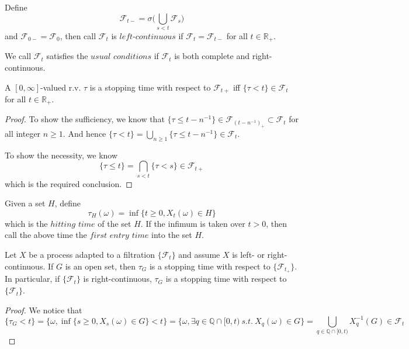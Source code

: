 \documentclass[lang=en, color=blue, ]{elegantbook}
\newcommand{\F}{\mathcal{F}}
\newcommand{\R}{\mathbb{R}}
\newcommand{\Q}{\mathbb{Q}}
\begin{document}
\begin{definition}
    Define
    \[\F_{t-} = \sigma\Big(\bigcup_{s<t}\F_s\Big)\]
    and $\F_{0-} = \F_0$, then call $\F_t$ is $left$-$continuous$ if $\F_t = \F_{t-}$ for all $t\in\R_+$.
\end{definition}

\begin{definition}
    We call $\F_t$ satisfies the $usual$ $conditions$ if $\F_t$ is both complete and right-continuous. 
\end{definition}

\begin{lemma}
    A $[0,\infty]$-valued r.v. $\tau$ is a stopping time with respect to $\F_{t+}$ iff $\{\tau < t\}\in \F_t$ for all $t\in \R_+$.
\end{lemma}
\begin{proof}\par
    To show the sufficiency, we know that $\{\tau \leq t-n^{-1}\} \in \F_{(t-{n^{-1}})_+} \subset \F_t$ for all integer $n\geq 1$. And hence $\{\tau < t\} = \bigcup_{n\geq 1}\{\tau \leq t-n^{-1}\} \in \F_{t}$.\par
    To show the necessity, we know
    \[\{\tau\leq t\} = \bigcap_{s<t} \{\tau < s\} \in \F_{t+}\]
    which is the required conclusion.
\end{proof}

\begin{definition}
    Given a set $H$, define
    \[\tau_H(\omega) = \inf\{t\geq 0, X_t(\omega) \in H\}\]
    which is the $hitting$ $time$ of the set $H$. If the infimum is taken over $t>0$, then call the above time the $first$ $entry$ $time$ into the set $H$.
\end{definition}

\begin{lemma}
    Let $X$ be a process adapted to a filtration $\{\F_t\}$ and assume $X$ is left- or right-continuous. If $G$ is an open set, then $\tau_G$ is a stopping time with respect to $\{\F_{t_+}\}$. In particular, if $\{\F_t\}$ is right-continuous, $\tau_G$ is a stopping time with respect to $\{\F_t\}$.
\end{lemma}
\begin{proof}\par
    We notice that
    \[\{\tau_G < t\} = \{\omega, \inf\{s\geq 0, X_s(\omega) \in G\}<t\} = \{\omega, \exists q\in\Q\cap[0,t)\ s.t.\ X_q(\omega)\in G\} = \bigcup_{q\in \Q\cap[0,t)} X_q^{-1}(G) \in \F_t\]
\end{proof}
\end{document}
